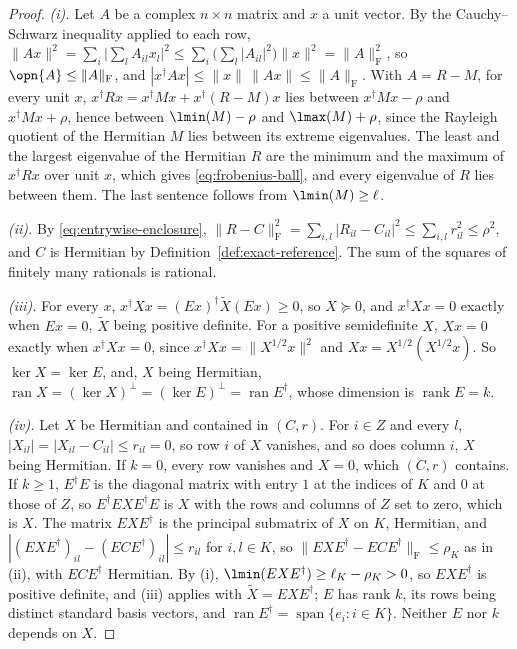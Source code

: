 \begin{proof}
\emph{(i).} Let $A$ be a complex $n\times n$ matrix and $x$ a unit vector.
By the Cauchy--Schwarz inequality applied to each row,
$\|Ax\|^{2}=\sum_i\big|\sum_lA_{il}x_l\big|^{2}
\le\sum_i\big(\sum_l|A_{il}|^{2}\big)\|x\|^{2}=\|A\|_{\mathrm F}^{2}$, so
$\opn{A}\le\|A\|_{\mathrm F}$, and $|x^{\dagger}Ax|\le\|x\|\,\|Ax\|
\le\|A\|_{\mathrm F}$. With $A=R-M$, for every unit $x$,
$x^{\dagger}Rx=x^{\dagger}Mx+x^{\dagger}(R-M)x$ lies between
$x^{\dagger}Mx-\rho$ and $x^{\dagger}Mx+\rho$, hence between
$\lmin(M)-\rho$ and $\lmax(M)+\rho$, since the Rayleigh quotient of the
Hermitian $M$ lies between its extreme eigenvalues. The least and the
largest eigenvalue of the Hermitian $R$ are the minimum and the maximum of
$x^{\dagger}Rx$ over unit $x$, which gives \eqref{eq:frobenius-ball}, and
every eigenvalue of $R$ lies between them. The last sentence follows from
$\lmin(M)\ge\ell$.

\emph{(ii).} By \eqref{eq:entrywise-enclosure},
$\|R-C\|_{\mathrm F}^{2}=\sum_{i,l}|R_{il}-C_{il}|^{2}\le\sum_{i,l}r_{il}^{2}
\le\rho^{2}$, and $C$ is Hermitian by Definition~\ref{def:exact-reference}.
The sum of the squares of finitely many rationals is rational.

\emph{(iii).} For every $x$,
$x^{\dagger}Xx=(Ex)^{\dagger}\widetilde X(Ex)\ge0$, so $X\succeq0$, and
$x^{\dagger}Xx=0$ exactly when $Ex=0$, $\widetilde X$ being positive
definite. For a positive semidefinite $X$, $Xx=0$ exactly when
$x^{\dagger}Xx=0$, since $x^{\dagger}Xx=\|X^{1/2}x\|^{2}$ and
$Xx=X^{1/2}(X^{1/2}x)$. So $\ker X=\ker E$, and, $X$ being Hermitian,
$\operatorname{ran}X=(\ker X)^{\perp}=(\ker E)^{\perp}
=\operatorname{ran}E^{\dagger}$, whose dimension is
$\operatorname{rank}E=k$.

\emph{(iv).} Let $X$ be Hermitian and contained in $(C,r)$. For $i\in Z$ and
every $l$, $|X_{il}|=|X_{il}-C_{il}|\le r_{il}=0$, so row $i$ of $X$
vanishes, and so does column $i$, $X$ being Hermitian. If $k=0$, every row
vanishes and $X=0$, which $(C,r)$ contains. If $k\ge1$, $E^{\dagger}E$ is the
diagonal matrix with entry $1$ at the indices of $K$ and $0$ at those of $Z$,
so $E^{\dagger}EXE^{\dagger}E$ is $X$ with the rows and columns of $Z$ set
to zero, which is $X$. The matrix $EXE^{\dagger}$ is the principal
submatrix of $X$ on $K$, Hermitian, and $|(EXE^{\dagger})_{il}
-(ECE^{\dagger})_{il}|\le r_{il}$ for $i,l\in K$, so
$\|EXE^{\dagger}-ECE^{\dagger}\|_{\mathrm F}\le\rho_K$ as in (ii), with
$ECE^{\dagger}$ Hermitian. By (i),
$\lmin(EXE^{\dagger})\ge\ell_K-\rho_K>0$, so $EXE^{\dagger}$ is positive
definite, and (iii) applies with $\widetilde X=EXE^{\dagger}$; $E$ has rank
$k$, its rows being distinct standard basis vectors, and
$\operatorname{ran}E^{\dagger}=\operatorname{span}\{e_i:i\in K\}$. Neither
$E$ nor $k$ depends on $X$.
\end{proof}
